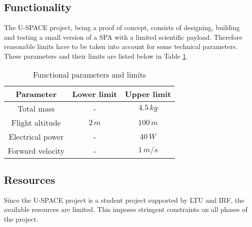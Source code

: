 \subsection{Functionality}
%
The \ac{U-SPACE} project, being a proof of concept, consists of designing, building and testing a small version of a \ac{SPA} with a limited scientific payload. Therefore reasonable limits have to be taken into account for some technical parameters. These parameters and their limits are listed below in Table \ref{tab:functionality}.
%
\begin{table}[H]
\centering
\caption{Functional parameters and limits}
\label{tab:functionality}
\begin{tabular}{c c c}
\hline
\textbf{Parameter} & \textbf{Lower limit} & \textbf{Upper limit}\\ \hline
Total mass & - & $4.5\,kg$\\
Flight altitude & $2\,m$ & $100\,m$\\
Electrical power & - & $40\,W$\\
Forward velocity & - & $1\,m/s$\\
\hline
\end{tabular}
\vspace{-1.0em}
\end{table}
%
\subsection{Resources}
%
Since the \ac{U-SPACE} project is a student project supported by \ac{LTU} and \ac{IRF}, the available resources are limited. This imposes stringent constraints on all phases of the project. %
%

